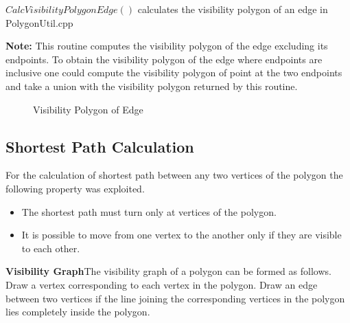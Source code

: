  $CalcVisibilityPolygonEdge()$ calculates the visibility polygon of an edge in PolygonUtil.cpp

{\bf Note:}
This routine computes the visibility polygon of the edge excluding its endpoints. To obtain the visibility polygon of the edge where
endpoints are inclusive one could compute the visibility polygon of point at the two endpoints and take a union with the visibility
polygon returned by this routine.

\begin{figure}[h]
\begin{center}
\caption{\label{fig:Visibility Polygon of Edge}Visibility Polygon of Edge}
\end{center}
\end{figure}



\subsection{Shortest Path Calculation}
For the calculation of shortest path between any two vertices of the polygon the following property was exploited.
\begin{itemize}
 \item The shortest path must turn only at vertices of the polygon.
 \item It is possible to move from one vertex to the another only if they are visible to each other.
\end{itemize}

\begin{definition}
{\bf Visibility Graph}The visibility graph of a polygon can be formed as follows. Draw a vertex corresponding to each vertex in the 
polygon. Draw an edge between two vertices if the line joining the corresponding vertices in the polygon lies completely inside the 
polygon.
\end{definition}


